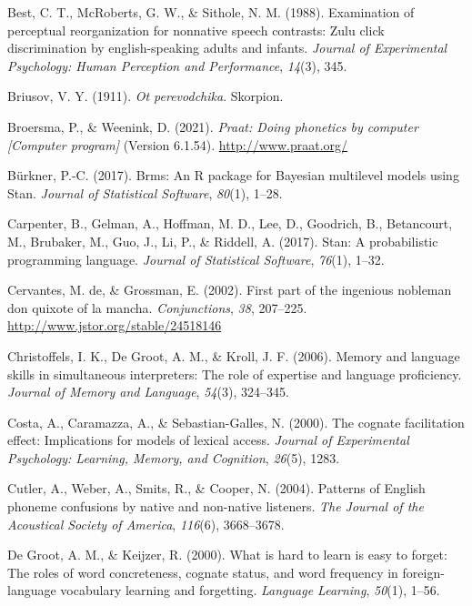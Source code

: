 \documentclass[
]{article}
\newlength{\cslhangindent}
\newenvironment{CSLReferences}[2] %
 {\begin{list}{}{%
  \setlength{\itemindent}{0pt}
  \setlength{\leftmargin}{0pt}
  \setlength{\parsep}{0pt}
  \ifodd #1
   \setlength{\leftmargin}{\cslhangindent}
   \setlength{\itemindent}{-1\cslhangindent}
  \fi
  \setlength{\itemsep}{#2\baselineskip}}}
 {\end{list}}
\begin{document}
\begin{CSLReferences}{1}{0}
Best, C. T., McRoberts, G. W., \& Sithole, N. M. (1988). Examination of
perceptual reorganization for nonnative speech contrasts: Zulu click
discrimination by english-speaking adults and infants. \emph{Journal of
Experimental Psychology: Human Perception and Performance},
\emph{14}(3), 345.

Briusov, V. Y. (1911). \emph{Ot perevodchika}. Skorpion.

Broersma, P., \& Weenink, D. (2021). \emph{Praat: Doing phonetics by
computer {[}{Computer} program{]}} (Version 6.1.54).
\url{http://www.praat.org/}

Bürkner, P.-C. (2017). Brms: {An R} package for {Bayesian} multilevel
models using {Stan}. \emph{Journal of Statistical Software},
\emph{80}(1), 1--28.

Carpenter, B., Gelman, A., Hoffman, M. D., Lee, D., Goodrich, B.,
Betancourt, M., Brubaker, M., Guo, J., Li, P., \& Riddell, A. (2017).
Stan: {A} probabilistic programming language. \emph{Journal of
Statistical Software}, \emph{76}(1), 1--32.

Cervantes, M. de, \& Grossman, E. (2002). First part of the ingenious
nobleman don quixote of la mancha. \emph{Conjunctions}, \emph{38},
207--225. \url{http://www.jstor.org/stable/24518146}

Christoffels, I. K., De Groot, A. M., \& Kroll, J. F. (2006). Memory and
language skills in simultaneous interpreters: {The} role of expertise
and language proficiency. \emph{Journal of Memory and Language},
\emph{54}(3), 324--345.

Costa, A., Caramazza, A., \& Sebastian-Galles, N. (2000). The cognate
facilitation effect: Implications for models of lexical access.
\emph{Journal of Experimental Psychology: Learning, Memory, and
Cognition}, \emph{26}(5), 1283.

Cutler, A., Weber, A., Smits, R., \& Cooper, N. (2004). Patterns of
{English} phoneme confusions by native and non-native listeners.
\emph{The Journal of the Acoustical Society of America}, \emph{116}(6),
3668--3678.

De Groot, A. M., \& Keijzer, R. (2000). What is hard to learn is easy to
forget: The roles of word concreteness, cognate status, and word
frequency in foreign-language vocabulary learning and forgetting.
\emph{Language Learning}, \emph{50}(1), 1--56.


\end{CSLReferences}
\end{document}
